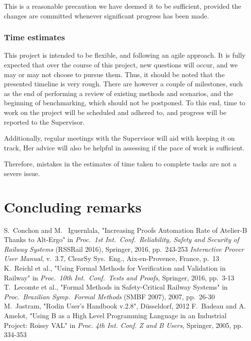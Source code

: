 \documentclass[11pt,journal]{IEEEtran}
\begin{document}
	This is a reasonable precaution we have deemed it to be sufficient, provided the changes are committed whenever significant progress has been made.
	
	\subsubsection{Time estimates}
	This project is intended to be flexible, and following an agile approach. It is fully expected that over the course of this project, new questions will occur, and we may or may not choose to pursue them. Thus, it should be noted that the presented timeline is very rough. There are however a couple of milestones, such as the end of performing a review of existing methods and scenarios, and the beginning of benchmarking, which should not be postponed. To this end, time to work on the project will be scheduled and adhered to, and progress will be reported to the Supervisor.
	
	Additionally, regular meetings with the Supervisor will aid with keeping it on track, Her advice will also be helpful in assessing if the pace of work is sufficient.
	
	Therefore, mistakes in the estimates of time taken to complete tasks are not a severe issue.
	
	\section{Concluding remarks}
	
	\IEEEPARstart{}{} 
	
	\begin{thebibliography}{1}
		S.~Conchon and M.~ Iguernlala, "Increasing Proofs Automation Rate	of Atelier-B Thanks to Alt-Ergo" in \emph{Proc.~1st Int.~Conf.~Reliability, Safety and Security of Railway Systems} (RSSRail 2016), Springer, 2016, pp.~243-253
		\emph{Interactive Prover User Manual}, v.~3.7, ClearSy Sys.~Eng., Aix-en-Provence, France, p.~13
		K.~Reichl et al., "Using Formal Methods for Verification and Validation in Railway" in \emph{Proc.~10th Int.~Conf.~Tests and Proofs}, Springer, 2016, pp.~3-13
		T.~Lecomte et al., "Formal Methods in Safety-Critical Railway Systems" in \emph{Proc.~Brazilian Symp.~Formal Methods} (SMBF 2007), 2007, pp.~26-30
		M.~Jastram, "Rodin User's Handbook v.2.8", D\"{u}sseldorf, 2012
		F.~Badeau and A. Amelot, "Using B as a High Level Programming Language in an Industrial Project: Roissy VAL" in \emph{Proc. 4th Int. Conf. Z and B Users}, Springer, 2005, pp. 334-353
		
		
	\end{thebibliography}
	
\end{document}
